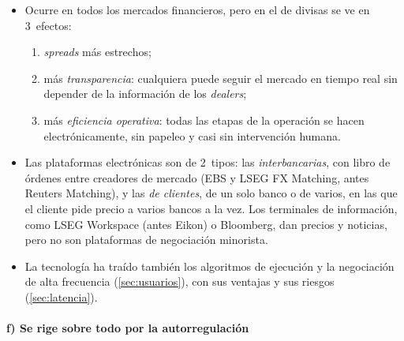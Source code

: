 \documentclass[11pt]{article}
\begin{document}
\begin{itemize}
\item Ocurre en todos los mercados financieros, pero en el de divisas se ve en 3~efectos:
  \begin{enumerate}
  \item \emph{spreads} más estrechos;
  \item más \emph{transparencia}: cualquiera puede seguir el mercado en tiempo real sin depender de la información de los \emph{dealers};
  \item más \emph{eficiencia operativa}: todas las etapas de la operación se hacen electrónicamente, sin papeleo y casi sin intervención humana.
  \end{enumerate}
\item Las plataformas electrónicas son de 2~tipos: las \emph{interbancarias}, con libro de órdenes entre creadores de mercado (EBS y LSEG FX Matching, antes Reuters Matching), y las \emph{de clientes}, de un solo banco o de varios, en las que el cliente pide precio a varios bancos a la vez. Los terminales de información, como LSEG Workspace (antes Eikon) o Bloomberg, dan precios y noticias, pero no son plataformas de negociación minorista\nocite{BIS2020Algos}.
\item La tecnología ha traído también los algoritmos de ejecución y la negociación de alta frecuencia (\ref{sec:usuarios}), con sus ventajas y sus riesgos (\ref{sec:latencia}).
\end{itemize}

\paragraph{f) Se rige sobre todo por la autorregulación}\label{sec:codigo-global}
\end{document}
